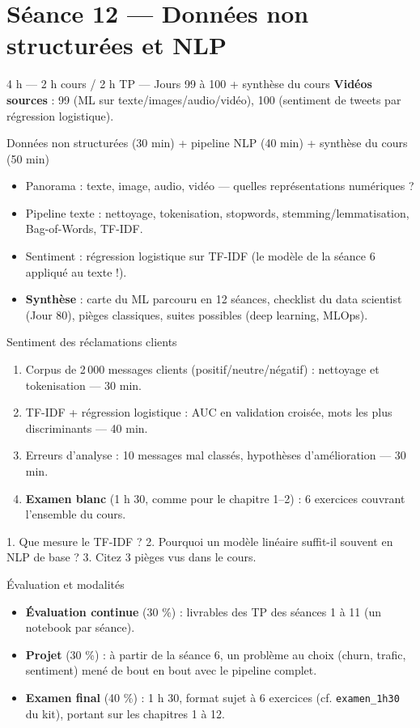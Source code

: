 \documentclass[11pt,a4paper]{article}
\begin{document}
\section*{Séance 12 — Données non structurées et NLP}
\begin{seancebox}{4 h — 2 h cours / 2 h TP — Jours 99 à 100 + synthèse du cours}
\textbf{Vidéos sources} : 99 (ML sur texte/images/audio/vidéo), 100 (sentiment de tweets par régression logistique).
\end{seancebox}
\begin{coursbox}{Données non structurées (30 min) + pipeline NLP (40 min) + synthèse du cours (50 min)}
\begin{itemize}[nosep]
\item Panorama : texte, image, audio, vidéo — quelles représentations numériques ?
\item Pipeline texte : nettoyage, tokenisation, stopwords, stemming/lemmatisation, Bag-of-Words, TF-IDF.
\item Sentiment : régression logistique sur TF-IDF (le modèle de la séance 6 appliqué au texte !).
\item \textbf{Synthèse} : carte du ML parcouru en 12 séances, checklist du data scientist (Jour 80), pièges classiques, suites possibles (deep learning, MLOps).
\end{itemize}
\end{coursbox}
\begin{tpbox}{Sentiment des réclamations clients}
\begin{enumerate}[nosep]
\item Corpus de 2\,000 messages clients (positif/neutre/négatif) : nettoyage et tokenisation — 30 min.
\item TF-IDF + régression logistique : AUC en validation croisée, mots les plus discriminants — 40 min.
\item Erreurs d'analyse : 10 messages mal classés, hypothèses d'amélioration — 30 min.
\item \textbf{Examen blanc} (1 h 30, comme pour le chapitre 1--2) : 6 exercices couvrant l'ensemble du cours.
\end{enumerate}
\end{tpbox}
\begin{evalbox}
1. Que mesure le TF-IDF ? 2. Pourquoi un modèle linéaire suffit-il souvent en NLP de base ? 3. Citez 3 pièges vus dans le cours.
\end{evalbox}

\vspace{4mm}
\begin{seancebox}{Évaluation et modalités}
\begin{itemize}[nosep]
\item \textbf{Évaluation continue} (30 \%) : livrables des TP des séances 1 à 11 (un notebook par séance).
\item \textbf{Projet} (30 \%) : à partir de la séance 6, un problème au choix (churn, trafic, sentiment) mené de bout en bout avec le pipeline complet.
\item \textbf{Examen final} (40 \%) : 1 h 30, format \og sujet à 6 exercices \fg{} (cf. \texttt{examen\_1h30} du kit), portant sur les chapitres 1 à 12.
\end{itemize}
\end{seancebox}
\end{document}
